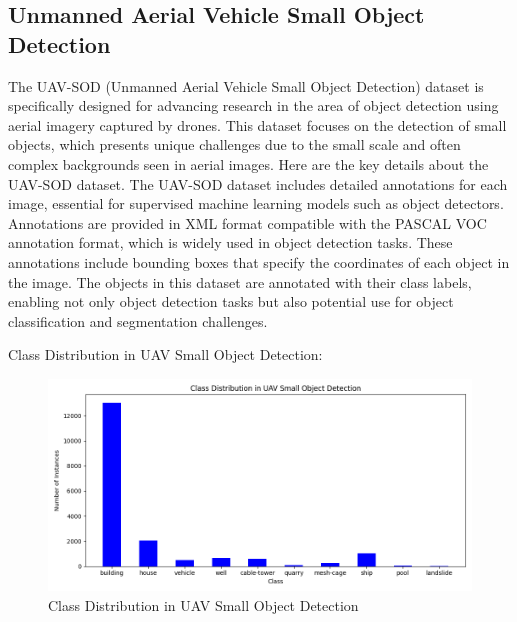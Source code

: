 \newpage
\subsection{Unmanned Aerial Vehicle Small Object Detection}

The UAV-SOD (Unmanned Aerial Vehicle Small Object Detection)  \cite{UAVSmallObjectKaggle}  dataset is specifically designed for advancing research in the area of object 
detection using aerial imagery captured by drones. This dataset focuses on the detection of small objects, which presents unique challenges due to the small 
scale and often complex backgrounds seen in aerial images. Here are the key details about the UAV-SOD dataset. The UAV-SOD dataset includes detailed annotations 
for each image, essential for supervised machine learning models such as object detectors. Annotations are provided in XML format compatible with the PASCAL VOC 
annotation format, which is widely used in object detection tasks. These annotations include bounding boxes that specify the coordinates of each object in the image. 
The objects in this dataset are annotated with their class labels, enabling not only object detection tasks but also potential use for object classification 
and segmentation challenges.

Class Distribution in UAV Small Object Detection:

\begin{figure}[h!]
    \centering
    \includegraphics[scale=0.55]{Figures/uav_sod_data_class_distribution.png}
    \caption{Class Distribution in UAV Small Object Detection}
    \label{fig:uav-class}
\end{figure}


